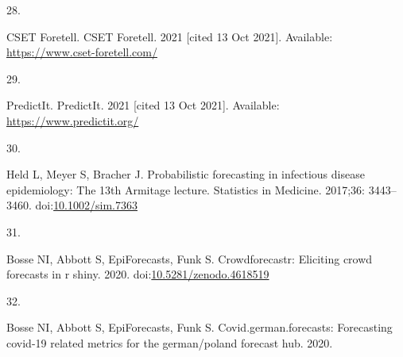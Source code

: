 \documentclass[10pt,letterpaper]{article} %
\newlength{\cslhangindent}
\newlength{\csllabelwidth}
\newlength{\cslentryspacingunit} %
\newenvironment{CSLReferences}[2] %
 {%
  \setlength{\parindent}{0pt}
  \ifodd #1
  \let\oldpar\par
  \def\par{\hangindent=\cslhangindent\oldpar}
  \fi
  \setlength{\parskip}{#2\cslentryspacingunit}
 }%
 {}
\newcommand{\CSLLeftMargin}[1]{\parbox[t]{\csllabelwidth}{#1}}
\newcommand{\CSLRightInline}[1]{\parbox[t]{\linewidth - \csllabelwidth}{#1}\break}
\providecommand{\DIFaddbegin}{} %
\providecommand{\DIFaddend}{} %
\providecommand{\DIFdelbegin}{} %
\providecommand{\DIFdelend}{} %
\newcommand{\DIFscaledelfig}{0.5}
\newlength{\DIFdelgraphicswidth} %
\newlength{\DIFdelgraphicsheight} %
\newcommand{\DIFaddincludegraphics}[2][]{{\color{blue}\fbox{\DIFOincludegraphics[#1]{#2}}}} %
\newcommand{\DIFdelincludegraphics}[2][]{%
\sbox{\DIFdelgraphicsbox}{\DIFOincludegraphics[#1]{#2}}%
\settoboxwidth{\DIFdelgraphicswidth}{\DIFdelgraphicsbox} %
\settoboxtotalheight{\DIFdelgraphicsheight}{\DIFdelgraphicsbox} %
\scalebox{\DIFscaledelfig}{%
\parbox[b]{\DIFdelgraphicswidth}{\usebox{\DIFdelgraphicsbox}\\[-\baselineskip] \rule{\DIFdelgraphicswidth}{0em}}\llap{\resizebox{\DIFdelgraphicswidth}{\DIFdelgraphicsheight}{%
\setlength{\unitlength}{\DIFdelgraphicswidth}%
\begin{picture}(1,1)%
\thicklines\linethickness{2pt} %
{\color[rgb]{1,0,0}\put(0,0){\framebox(1,1){}}}%
{\color[rgb]{1,0,0}\put(0,0){\line( 1,1){1}}}%
{\color[rgb]{1,0,0}\put(0,1){\line(1,-1){1}}}%
\end{picture}%
}\hspace*{3pt}}} %
} %
\DeclareRobustCommand{\DIFaddbegin}{\DIFOaddbegin \let\includegraphics\DIFaddincludegraphics} %
\DeclareRobustCommand{\DIFaddend}{\DIFOaddend \let\includegraphics\DIFOincludegraphics} %
\DeclareRobustCommand{\DIFdelbegin}{\DIFOdelbegin \let\includegraphics\DIFdelincludegraphics} %
\DeclareRobustCommand{\DIFdelend}{\DIFOaddend \let\includegraphics\DIFOincludegraphics} %
\begin{document}
\begin{CSLReferences}{0}{0}
\leavevmode{}%
\CSLLeftMargin{28. }
\DIFdelbegin %
\DIFdelend \DIFaddbegin \CSLRightInline{CSET Foretell. {CSET Foretell}. 2021 {[}cited 13 Oct
2021{]}. Available: \url{https://www.cset-foretell.com/}}
\DIFaddend 

\leavevmode{}%
\CSLLeftMargin{29. }
\DIFdelbegin %
\DIFdelend \DIFaddbegin \CSLRightInline{PredictIt. {PredictIt}. 2021 {[}cited 13 Oct 2021{]}.
Available: \url{https://www.predictit.org/}}
\DIFaddend 

\leavevmode{}%
\CSLLeftMargin{30. }
\DIFdelbegin %
\DIFdelend \DIFaddbegin \CSLRightInline{Held L, Meyer S, Bracher J. Probabilistic forecasting in
infectious disease epidemiology: The 13th {Armitage} lecture. Statistics
in Medicine. 2017;36: 3443--3460.
doi:\href{https://doi.org/10.1002/sim.7363}{10.1002/sim.7363}}
\DIFaddend 

\leavevmode{}%
\CSLLeftMargin{31. }
\DIFdelbegin %
\DIFdelend \DIFaddbegin \CSLRightInline{Bosse NI, Abbott S, EpiForecasts, Funk S.
Crowdforecastr: Eliciting crowd forecasts in r shiny. 2020.
doi:\href{https://doi.org/10.5281/zenodo.4618519}{10.5281/zenodo.4618519}}
\DIFaddend 

\leavevmode{}%
\CSLLeftMargin{32. }
\CSLRightInline{Bosse NI, Abbott S, EpiForecasts, Funk S.
Covid.german.forecasts: Forecasting covid-19 related metrics for the
german/poland forecast hub. 2020. }


\end{CSLReferences}
\end{document}
